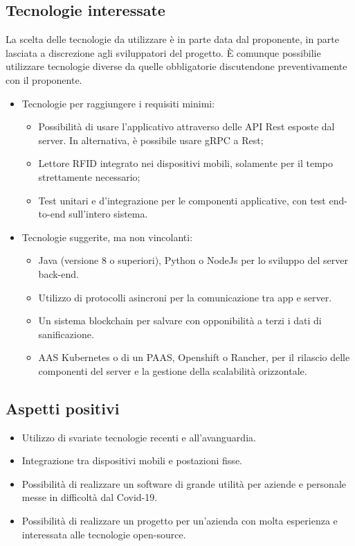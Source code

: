 \subsection{Tecnologie interessate}
La scelta delle tecnologie da utilizzare è in parte data dal proponente, in parte lasciata a discrezione agli sviluppatori del progetto.
È comunque possibilie utilizzare tecnologie diverse da quelle obbligatorie discutendone preventivamente con il proponente.
\begin{itemize}
    \item Tecnologie per raggiungere i requisiti minimi:
    \begin{itemize}
        \item Possibilità di usare l'applicativo attraverso delle API Rest esposte dal server. In alternativa, è possibile usare gRPC a Rest;
        \item Lettore RFID integrato nei dispositivi mobili, solamente per il tempo strettamente necessario;
        \item Test unitari e d'integrazione per le componenti applicative, con test end-to-end sull'intero sistema. 
    \end{itemize}
    \item Tecnologie suggerite, ma non vincolanti:
    \begin{itemize}
        \item Java (versione 8 o superiori), Python o NodeJs per lo sviluppo del server back-end.
        \item Utilizzo di protocolli asincroni per la comunicazione tra app e server.
        \item Un sistema blockchain per salvare con opponibilità a terzi i dati di sanificazione.
        \item AAS Kubernetes o di un PAAS, Openshift o Rancher, per il rilascio delle componenti del server e la gestione della scalabilità orizzontale.
    \end{itemize}
\end{itemize}

\subsection{Aspetti positivi}
\begin{itemize}
    \item Utilizzo di svariate tecnologie recenti e all'avanguardia.
    \item Integrazione tra dispositivi mobili e postazioni fisse.
    \item Possibilità di realizzare un software di grande utilità per aziende e personale messe in difficoltà dal Covid-19.
    \item Possibilità di realizzare un progetto per un'azienda con molta esperienza e interessata alle tecnologie open-source.
\end{itemize}

